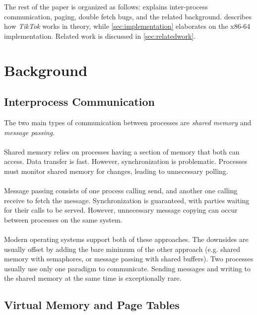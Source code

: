 The rest of the paper is organized as follows:  explains 
inter-process communication, paging, double fetch bugs, and the related
background.  describes how \emph{TikTok} works in theory, while
\cref{sec:implementation} elaborates on the x86-64 implementation. Related work
is discussed in \cref{sec:relatedwork}.

\section{Background}

\label{sec:background}
\subsection{Interprocess Communication}

The two main types of communication between processes are \emph{shared memory} 
and \emph{message passing}\cite{silberschatz2018operating}.
\\
\\
Shared memory relies on processes having a section of memory that both can 
access. Data transfer is fast. However, synchronization is problematic. 
Processes must monitor shared memory for changes, leading to unnecessary
polling.
\\
\\
Message passing consists of one process calling send, and another one calling
receive to fetch the message. Synchronization is guaranteed, with parties
waiting for their calls to be served. However, unnecessary message copying can
occur between processes on the same system.
\\
\\
Modern operating systems support both of these approaches. The downsides are
usually offset by adding the  bare minimum of the other approach (e.g. shared
memory with semaphores, or message passing with shared buffers). Two processes
usually use only one paradigm to communicate. Sending messages and writing
to the shared memory at the same time is exceptionally rare.

\subsection{Virtual Memory and Page Tables} \label{sec:vm}


